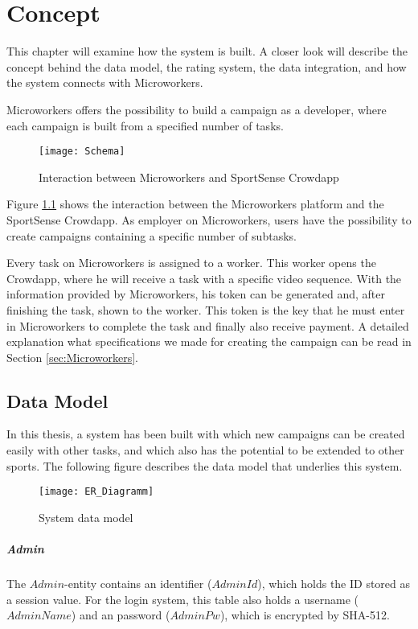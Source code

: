\chapter{Concept}
This chapter will examine how the system is built. A closer look will describe the concept behind the data model, the rating system, the data integration, and how the system connects with Microworkers.

Microworkers offers the possibility to build a campaign as a developer, where each campaign is built from a specified number of tasks.

\begin{figure}
    \centering
    \texttt{[image: Schema]}
    \caption{Interaction between Microworkers and SportSense Crowdapp}
    \label{fig:Schema}
\end{figure}

Figure \ref{fig:Schema} shows the interaction between the Microworkers platform and the SportSense Crowdapp. As employer on Microworkers, users have the possibility to create campaigns containing a specific number of subtasks.

Every task on Microworkers is assigned to a worker. This worker opens the Crowdapp, where he will receive a task with a specific video sequence. With the information provided by Microworkers, his token can be generated and, after finishing the task, shown to the worker.
This token is the key that he must enter in Microworkers to complete the task and finally also receive payment. A detailed explanation what specifications we made for creating the campaign can be read in Section \ref{sec:Microworkers}.

\section{Data Model}

In this thesis, a system has been built with which new campaigns can be created easily with other tasks, and which also has the potential to be extended to other sports. The following figure describes the data model that underlies this system.

\begin{figure}
    \centering
    \hspace*{-0.15\textwidth}
    \texttt{[image: ER\_Diagramm]}
    \caption{System data model}
    \label{fig:systemmodel}
\end{figure}

\paragraph{Admin}
The $Admin$-entity contains an identifier ($AdminId$), which holds the ID stored as a session value. For the login system, this table also holds a username ($AdminName$) and an password ($AdminPw$), which is encrypted by SHA-512.

